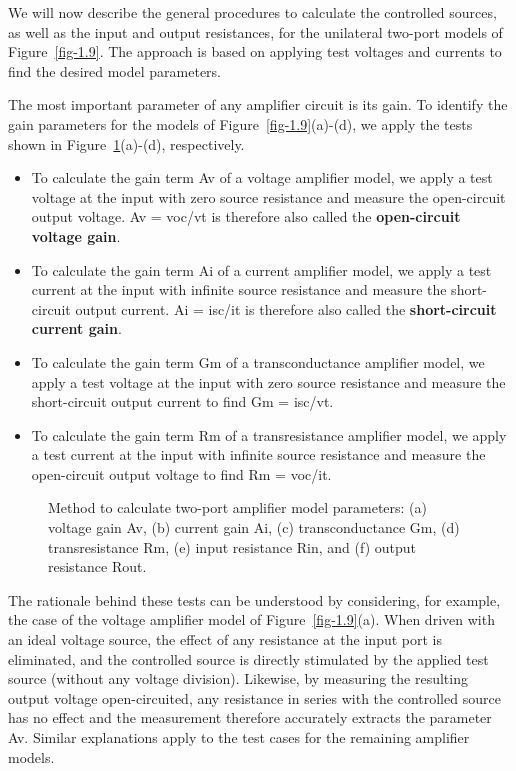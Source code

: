 \documentclass[
  11pt,
  letterpaper,
  abstract]{scrbook}
\begin{document}
We will now describe the general procedures to calculate the controlled
sources, as well as the input and output resistances, for the unilateral
two-port models of Figure~\ref{fig-1.9}. The approach is based on
applying test voltages and currents to find the desired model
parameters.

The most important parameter of any amplifier circuit is its gain. To
identify the gain parameters for the models of
Figure~\ref{fig-1.9}(a)-(d), we apply the tests shown in
Figure~\ref{fig-1.13}(a)-(d), respectively.

\begin{itemize}
\item
  To calculate the gain term Av of a voltage amplifier model, we apply a
  test voltage at the input with zero source resistance and measure the
  open-circuit output voltage. Av = voc/vt is therefore also called the
  \textbf{open-circuit voltage gain}.
\item
  To calculate the gain term Ai of a current amplifier model, we apply a
  test current at the input with infinite source resistance and measure
  the short-circuit output current. Ai = isc/it is therefore also called
  the \textbf{short-circuit current gain}.
\item
  To calculate the gain term Gm of a transconductance amplifier model,
  we apply a test voltage at the input with zero source resistance and
  measure the short-circuit output current to find Gm = isc/vt.
\item
  To calculate the gain term Rm of a transresistance amplifier model, we
  apply a test current at the input with infinite source resistance and
  measure the open-circuit output voltage to find Rm = voc/it.
\end{itemize}

\begin{figure}


\caption{\label{fig-1.13}Method to calculate two-port amplifier model
parameters: (a) voltage gain Av, (b) current gain Ai, (c)
transconductance Gm, (d) transresistance Rm, (e) input resistance Rin,
and (f) output resistance Rout.}

\end{figure}%

The rationale behind these tests can be understood by considering, for
example, the case of the voltage amplifier model of
Figure~\ref{fig-1.9}(a). When driven with an ideal voltage source, the
effect of any resistance at the input port is eliminated, and the
controlled source is directly stimulated by the applied test source
(without any voltage division). Likewise, by measuring the resulting
output voltage open-circuited, any resistance in series with the
controlled source has no effect and the measurement therefore accurately
extracts the parameter Av. Similar explanations apply to the test cases
for the remaining amplifier models.
\end{document}
